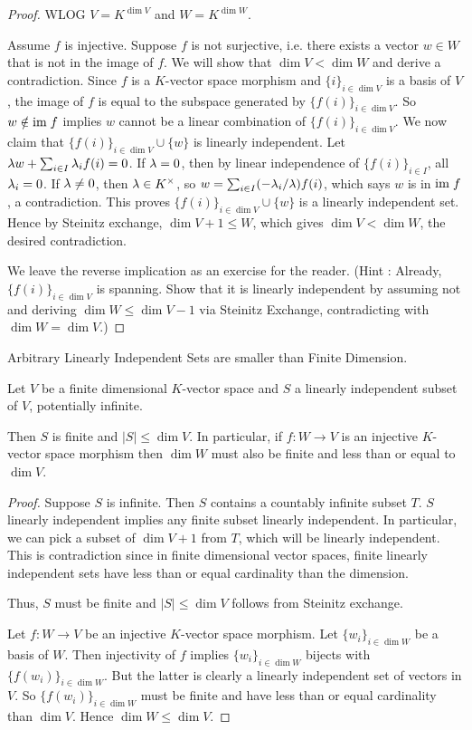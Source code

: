 \documentclass[../book.tex]{subfiles}
\begin{document}
\begin{proof}
    WLOG $V = K^{\dim V}$ and $W = K^{\dim W}$. 

    Assume $f$ is injective. 
    Suppose $f$ is not surjective, i.e.
    there exists a vector $w \in W$ that is not in the image of $f$. 
    We will show that $\dim V < \dim W$ and derive a contradiction. 
    Since $f$ is a $K$-vector space morphism and 
    $\{i\}_{i\in\dim V}$ is a basis of $V$, 
    the image of $f$ is equal to the subspace generated by $\{f(i)\}_{i\in\dim V}$.
    So $w \notin \textnormal{im}\; f$ implies 
    $w$ cannot be a linear combination of $\{f(i)\}_{i\in\dim V}$.
    We now claim that $\{f(i)\}_{i\in\dim V} \cup \{w\}$ is linearly independent. 
    Let $\lambda w + \sum_{i\in I} \lambda_i f(i) = 0$. 
    If $\lambda = 0$, then by linear independence of $\{f(i)\}_{i\in I}$, all $\lambda_i = 0$. If $\lambda \neq 0$, then $\lambda \in K^\times$,
    so $w = \sum_{i\in I} (-\lambda_i/\lambda)f(i)$, 
    which says $w$ is in $\textnormal{im}\; f$, a contradiction. 
    This proves $\{f(i)\}_{i\in\dim V} \cup \{w\}$ is a linearly independent set.
    Hence by Steinitz exchange, $\dim V + 1 \leq W$,
    which gives $\dim V < \dim W$, the desired contradiction. 
    
    We leave the reverse implication as an exercise for the reader. 
    (Hint : Already, $\{f(i)\}_{i\in\dim V}$ is spanning. 
    Show that it is linearly independent by assuming not and 
    deriving $\dim W \leq \dim V - 1$ via Steinitz Exchange, 
    contradicting with $\dim W = \dim V$.)
\end{proof}
\begin{cor} Arbitrary Linearly Independent Sets are smaller than Finite Dimension.
    
    Let $V$ be a finite dimensional $K$-vector space and
    $S$ a linearly independent subset of $V$, potentially infinite.
    
    Then $S$ is finite and $|S| \leq \dim V$. 
    In particular, if $f : W \to V$ is an injective $K$-vector space morphism
    then $\dim W$ must also be finite and less than or equal to $\dim V$.
\end{cor}
\begin{proof}
    Suppose $S$ is infinite. Then $S$ contains a countably infinite subset $T$.
    $S$ linearly independent implies any finite subset linearly independent.
    In particular, we can pick a subset of $\dim V + 1$ from $T$,
    which will be linearly independent. 
    This is contradiction since in finite dimensional vector spaces,
    finite linearly independent sets 
    have less than or equal cardinality than the dimension.
    
    Thus, $S$ must be finite and $|S| \leq \dim V$ follows from Steinitz exchange.
    
    Let $f : W \to V$ be an injective $K$-vector space morphism. 
    Let $\{w_i\}_{i\in\dim W}$ be a basis of $W$. 
    Then injectivity of $f$ implies $\{w_i\}_{i\in\dim W}$ bijects with
    $\{f(w_i)\}_{i\in\dim W}$.
    But the latter is clearly a linearly independent set of vectors in $V$.
    So $\{f(w_i)\}_{i\in\dim W}$ must be finite and 
    have less than or equal cardinality than $\dim V$.
    Hence $\dim W \leq \dim V$. 
\end{proof}
\end{document}
